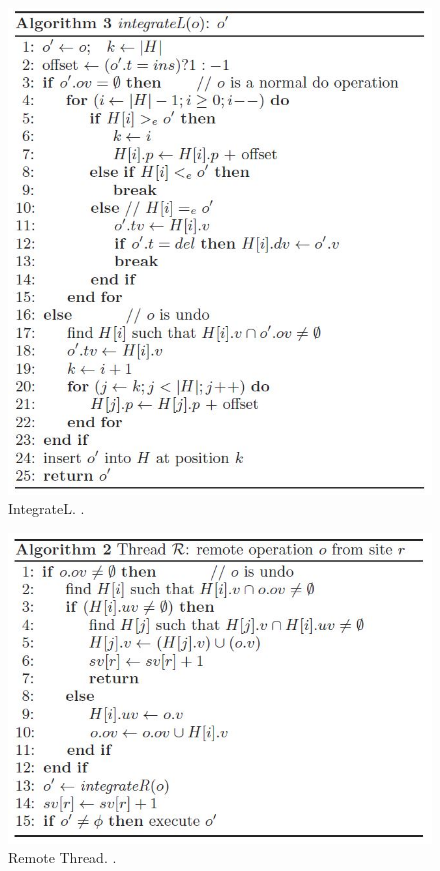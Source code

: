 \documentclass[11pt, a4paper, oneside, openright]{article} %
\begin{document}
\begin{figure}[!h]
\begin{center}
\includegraphics[scale=0.5]{snapshots/integrateL.jpg}
\end{center}
\caption{IntegrateL. \cite{abtuu}.\label{snap2}}
\end{figure}

\begin{figure}[!h]
\begin{center}
\includegraphics[scale=0.5]{snapshots/remoteThread.jpg}
\end{center}
\caption{Remote Thread. \cite{abtuu}.\label{snap3}}
\end{figure}
\end{document}
